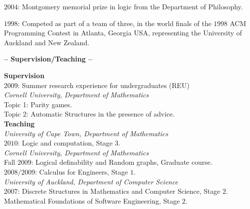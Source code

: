 \documentclass[a4paper]{article}
\def\tit#1{\medskip \begin{center}  {\Large {\bf -- #1 -- }} \end{center}}
\newif\ifcut
\begin{document}
$2004$: Montgomery memorial prize in logic from the Department of Philosophy.



%

\iffalse

$1998$ and $1999$: Summer Scholarships from the Mathematics Department
 for vacational study and research.\\
\fi


$1998$: Competed as part of a team of three, in the world finals of the $1998$
ACM Programming Contest in Atlanta, Georgia USA, representing the University of Auckland
and New Zealand. 
\fi

\ifcut
\tit{Supervision/Teaching}

{\bf Supervision}\\
$2009$: Summer research experience for undergraduates (REU)\\
{\em  Cornell University, Department of Mathematics}\\
Topic 1: Parity games.\\
Topic 2: Automatic Structures in the presence of advice.\\

 {\bf Teaching}\\
{\it University of Cape Town, Department of Mathematics}\\
$2010$: Logic and computation, Stage $3$.\\

 {\it Cornell University, Department of Mathematics}\\
 Fall $2009$: Logical definability and Random graphs, Graduate course.\\ 
 $2008/2009$: Calculus for Engineers, Stage $1$.\\

 {\it University of Auckland, Department of Computer Science}\\
 $2007$: Discrete Structures in Mathematics and Computer Science, Stage $2$.\\
 Mathematical Foundations of Software Engineering, Stage $2$.\\
\end{document}
